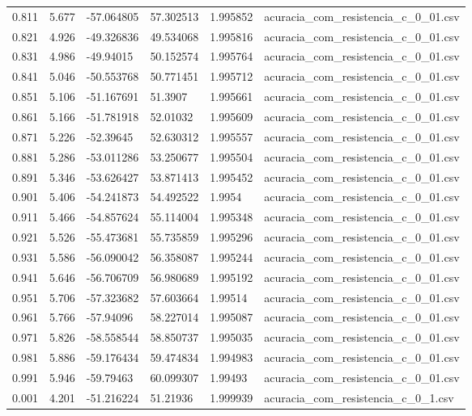 \begin{table}
\begin{tabular}{llllll}
0.811 & 5.677 & -57.064805 & 57.302513 & 1.995852 & acuracia\_com\_resistencia\_c\_0\_01.csv \\
0.821 & 4.926 & -49.326836 & 49.534068 & 1.995816 & acuracia\_com\_resistencia\_c\_0\_01.csv \\
0.831 & 4.986 & -49.94015 & 50.152574 & 1.995764 & acuracia\_com\_resistencia\_c\_0\_01.csv \\
0.841 & 5.046 & -50.553768 & 50.771451 & 1.995712 & acuracia\_com\_resistencia\_c\_0\_01.csv \\
0.851 & 5.106 & -51.167691 & 51.3907 & 1.995661 & acuracia\_com\_resistencia\_c\_0\_01.csv \\
0.861 & 5.166 & -51.781918 & 52.01032 & 1.995609 & acuracia\_com\_resistencia\_c\_0\_01.csv \\
0.871 & 5.226 & -52.39645 & 52.630312 & 1.995557 & acuracia\_com\_resistencia\_c\_0\_01.csv \\
0.881 & 5.286 & -53.011286 & 53.250677 & 1.995504 & acuracia\_com\_resistencia\_c\_0\_01.csv \\
0.891 & 5.346 & -53.626427 & 53.871413 & 1.995452 & acuracia\_com\_resistencia\_c\_0\_01.csv \\
0.901 & 5.406 & -54.241873 & 54.492522 & 1.9954 & acuracia\_com\_resistencia\_c\_0\_01.csv \\
0.911 & 5.466 & -54.857624 & 55.114004 & 1.995348 & acuracia\_com\_resistencia\_c\_0\_01.csv \\
0.921 & 5.526 & -55.473681 & 55.735859 & 1.995296 & acuracia\_com\_resistencia\_c\_0\_01.csv \\
0.931 & 5.586 & -56.090042 & 56.358087 & 1.995244 & acuracia\_com\_resistencia\_c\_0\_01.csv \\
0.941 & 5.646 & -56.706709 & 56.980689 & 1.995192 & acuracia\_com\_resistencia\_c\_0\_01.csv \\
0.951 & 5.706 & -57.323682 & 57.603664 & 1.99514 & acuracia\_com\_resistencia\_c\_0\_01.csv \\
0.961 & 5.766 & -57.94096 & 58.227014 & 1.995087 & acuracia\_com\_resistencia\_c\_0\_01.csv \\
0.971 & 5.826 & -58.558544 & 58.850737 & 1.995035 & acuracia\_com\_resistencia\_c\_0\_01.csv \\
0.981 & 5.886 & -59.176434 & 59.474834 & 1.994983 & acuracia\_com\_resistencia\_c\_0\_01.csv \\
0.991 & 5.946 & -59.79463 & 60.099307 & 1.99493 & acuracia\_com\_resistencia\_c\_0\_01.csv \\
0.001 & 4.201 & -51.216224 & 51.21936 & 1.999939 & acuracia\_com\_resistencia\_c\_0\_1.csv \\

\end{tabular}
\end{table}
